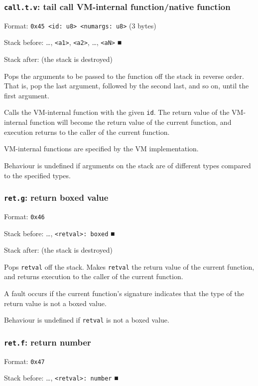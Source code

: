 \documentclass[11pt]{article}
\begin{document}
\subsubsection{\texttt{call.t.v}: tail call VM-internal function/native function}
\label{sec:org22cfce9}
Format: \texttt{0x45 <id: u8> <numargs: u8>} (3 bytes)

Stack before: \ldots{}​, \texttt{<a1>}, \texttt{<a2>}, \ldots{}​, \texttt{<aN>} ■

Stack after: (the stack is destroyed)

Pops the arguments to be passed to the function off the stack in reverse
order. That is, pop the last argument, followed by the second last, and
so on, until the first argument.

Calls the VM-internal function with the given \texttt{id}. The return value of
the VM-internal function will become the return value of the current
function, and execution returns to the caller of the current function.

VM-internal functions are specified by the VM implementation.

Behaviour is undefined if arguments on the stack are of different types
compared to the specified types.

\subsubsection{\texttt{ret.g}: return boxed value}
\label{sec:org5c86ae1}
Format: \texttt{0x46}

Stack before: \ldots{}​, \texttt{<retval>: boxed} ■

Stack after: (the stack is destroyed)

Pops \texttt{retval} off the stack. Makes \texttt{retval} the return value of the
current function, and returns execution to the caller of the current
function.

A fault occurs if the current function's signature indicates that the
type of the return value is not a boxed value.

Behaviour is undefined if \texttt{retval} is not a boxed value.

\subsubsection{\texttt{ret.f}: return number}
\label{sec:org24d7891}
Format: \texttt{0x47}

Stack before: \ldots{}​, \texttt{<retval>: number} ■
\end{document}
